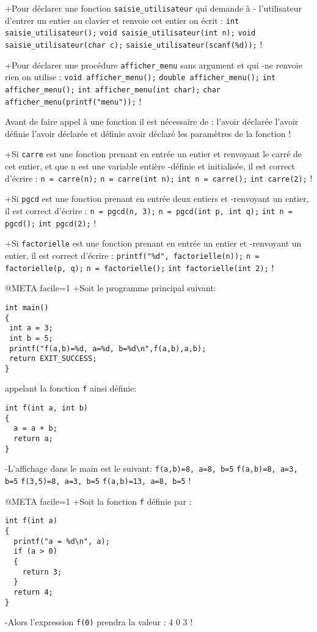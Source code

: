 +Pour déclarer une fonction \verb|saisie_utilisateur| qui demande à
- l'utilisateur d'entrer un entier au clavier et renvoie cet entier on écrit :
 \verb|int saisie_utilisateur();|
 \verb|void saisie_utilisateur(int n);|
 \verb|void saisie_utilisateur(char c);|
 \verb|saisie_utilisateur(scanf(%d));|
!

+Pour déclarer une procédure \verb|afficher_menu| sans argument et qui
-ne renvoie rien on utilise :
 \verb|void afficher_menu();|
 \verb|double afficher_menu();|
 \verb|int afficher_menu();|
 \verb|int afficher_menu(int char);|
 \verb|char afficher_menu(printf("menu"));|
!

Avant de faire appel à une fonction il est nécessaire de :
 l'avoir déclarée
 l'avoir définie
 l'avoir déclarée et définie
 avoir déclaré les paramètres de la fonction
!

+Si \verb|carre| est une fonction prenant en entrée un entier et
renvoyant le carré de cet entier, et que n est une variable entière
-définie et initialisée, il est correct d'écrire :
 \verb+n = carre(n);+
 \verb+n = carre(int n);+
 \verb+int n = carre();+
 \verb+int carre(2);+
!

+Si \verb|pgcd| est une fonction prenant en entrée deux entiers et
-renvoyant un entier, il est correct d'écrire :
 \verb+n = pgcd(n, 3);+
 \verb+n = pgcd(int p, int q);+
 \verb+int n = pgcd();+
 \verb+int pgcd(2);+
!

+Si \verb|factorielle| est une fonction prenant en entrée un entier et
-renvoyant un entier, il est correct d'écrire :
 \verb+printf("%d", factorielle(n));+
 \verb+n = factorielle(p, q);+
 \verb+n = factorielle();+
 \verb+int factorielle(int 2);+
!

@META facile=1
+Soit le programme principal suivant: 
 \begin{verbatim}
int main() 
{
 int a = 3;
 int b = 5;
 printf("f(a,b)=%d, a=%d, b=%d\n",f(a,b),a,b);
 return EXIT_SUCCESS;
}
\end{verbatim}
 appelant la fonction \verb|f| ainsi définie: 
 \begin{verbatim}
int f(int a, int b)
{
  a = a + b; 
  return a;
}
\end{verbatim}
-L'affichage dans le main est le suivant: 
 \verb|f(a,b)=8, a=8, b=5|
 \verb|f(a,b)=8, a=3, b=5|
 \verb|f(3,5)=8, a=3, b=5|
 \verb|f(a,b)=13, a=8, b=5|
!

@META facile=1
+Soit la fonction \verb|f| définie par :
\begin{verbatim}
int f(int a)
{
  printf("a = %d\n", a);
  if (a > 0)
  {
    return 3;
  }
  return 4;
}
\end{verbatim}
-Alors l'expression \verb|f(0)| prendra la valeur :
 4
 0
 3
!


